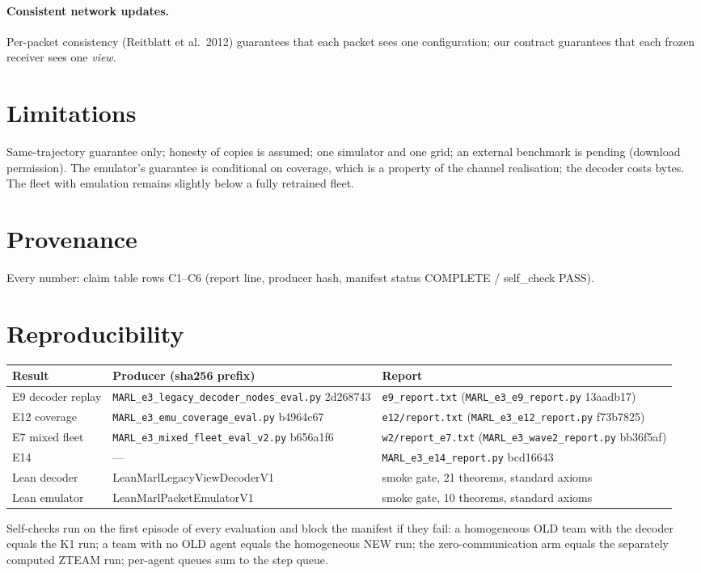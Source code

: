 \documentclass[11pt]{article}
\newcommand{\lean}[1]{\textsf{\footnotesize #1}}
\begin{document}
\paragraph{Consistent network updates.} Per-packet consistency (Reitblatt et al.\ 2012) guarantees that each packet sees one configuration;
our contract guarantees that each frozen receiver sees one \emph{view}.

\section{Limitations}
Same-trajectory guarantee only; honesty of copies is assumed; one simulator and one grid; an external benchmark is pending (download
permission). The emulator's guarantee is conditional on coverage, which is a property of the channel realisation; the decoder costs
bytes. The fleet with emulation remains slightly below a fully retrained fleet.

\section*{Provenance}
Every number: claim table rows C1--C6 (report line, producer hash, manifest status COMPLETE / self\_check PASS).

\appendix
\section{Reproducibility}
\begin{tabular}{lll}\toprule
Result & Producer (sha256 prefix) & Report\\\midrule
E9 decoder replay & \texttt{MARL\_e3\_legacy\_decoder\_nodes\_eval.py} 2d268743 & \texttt{e9\_report.txt} (\texttt{MARL\_e3\_e9\_report.py} 13aadb17)\\
E12 coverage & \texttt{MARL\_e3\_emu\_coverage\_eval.py} b4964c67 & \texttt{e12/report.txt} (\texttt{MARL\_e3\_e12\_report.py} f73b7825)\\
E7 mixed fleet & \texttt{MARL\_e3\_mixed\_fleet\_eval\_v2.py} b656a1f6 & \texttt{w2/report\_e7.txt} (\texttt{MARL\_e3\_wave2\_report.py} bb36f5af)\\
E14 & --- & \texttt{MARL\_e3\_e14\_report.py} bcd16643\\
Lean decoder & \lean{LeanMarlLegacyViewDecoderV1} & smoke gate, 21 theorems, standard axioms\\
Lean emulator & \lean{LeanMarlPacketEmulatorV1} & smoke gate, 10 theorems, standard axioms\\\bottomrule
\end{tabular}

\noindent Self-checks run on the first episode of every evaluation and block the manifest if they fail: a homogeneous OLD team with the
decoder equals the K1 run; a team with no OLD agent equals the homogeneous NEW run; the zero-communication arm equals the separately
computed ZTEAM run; per-agent queues sum to the step queue.
\end{document}
